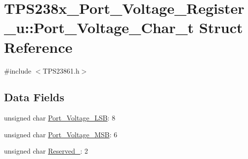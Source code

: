 \hypertarget{struct_t_p_s238x___port___voltage___register__u_1_1_port___voltage___char__t}{\section{T\-P\-S238x\-\_\-\-Port\-\_\-\-Voltage\-\_\-\-Register\-\_\-u\-:\-:Port\-\_\-\-Voltage\-\_\-\-Char\-\_\-t Struct Reference}
\label{struct_t_p_s238x___port___voltage___register__u_1_1_port___voltage___char__t}
}


{\ttfamily \#include $<$T\-P\-S23861.\-h$>$}

\subsection*{Data Fields}
\begin{DoxyCompactItemize}
\item 
unsigned char \hyperlink{struct_t_p_s238x___port___voltage___register__u_1_1_port___voltage___char__t_a9aea47e8ec884490afde7e941225aead}{Port\-\_\-\-Voltage\-\_\-\-L\-S\-B}\-: 8
\item 
unsigned char \hyperlink{struct_t_p_s238x___port___voltage___register__u_1_1_port___voltage___char__t_a9fa245bfa43cc747cf71eb3983945b35}{Port\-\_\-\-Voltage\-\_\-\-M\-S\-B}\-: 6
\item 
unsigned char \hyperlink{struct_t_p_s238x___port___voltage___register__u_1_1_port___voltage___char__t_a50336d796fe9ce2e788f93f105b0577a}{Reserved\-\_}\-: 2
\end{DoxyCompactItemize}


